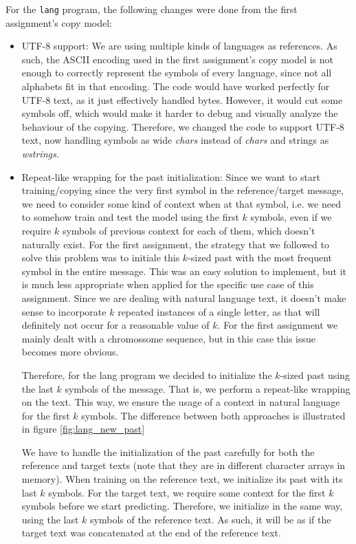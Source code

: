 \documentclass{article}
\begin{document}
For the \texttt{lang} program, the following changes were done from the first assignment's copy model:
\begin{itemize}
    \item UTF-8 support:
    We are using multiple kinds of languages as references.
    As such, the ASCII encoding used in the first assignment's copy model is not enough to correctly represent the symbols of every language, since not all alphabets fit in that encoding.
    The code would have worked perfectly for UTF-8 text, as it just effectively handled bytes.
    However, it would cut some symbols off, which would make it harder to debug and visually analyze the behaviour of the copying.
    Therefore, we changed the code to support UTF-8 text, now handling symbols as wide \textit{chars} instead of \textit{chars} and strings as \textit{wstrings}.
    
    \item Repeat-like wrapping for the past initialization:
    Since we want to start training/copying since the very first symbol in the reference/target message, we need to consider some kind of context when at that symbol, i.e. we need to somehow train and test the model using the first $k$ symbols, even if we require $k$ symbols of previous context for each of them, which doesn't naturally exist.
    For the first assignment, the strategy that we followed to solve this problem was to initiale this $k$-sized past with the most frequent symbol in the entire message.
    This was an easy solution to implement, but it is much less appropriate when applied for the specific use case of this assignment.
    Since we are dealing with natural language text, it doesn't make sense to incorporate $k$ repeated instances of a single letter, as that will definitely not occur for a reasonable value of $k$.
    For the first assignment we mainly dealt with a chromossome sequence, but in this case this issue becomes more obvious.

    Therefore, for the lang program we decided to initialize the $k$-sized past using the last $k$ symbols of the message.
    That is, we perform a repeat-like wrapping on the text.
    This way, we ensure the usage of a context in natural language for the first $k$ symbols.
    The difference between both approaches is illustrated in figure \ref{fig:lang_new_past}

    We have to handle the initialization of the past carefully for both the reference and target texts (note that they are in different character arrays in memory).
    When training on the reference text, we initialize its past with its last $k$ symbols.
    For the target text, we require some context for the first $k$ symbols before we start predicting.
    Therefore, we initialize in the same way, using the last $k$ symbols of the reference text.
    As such, it will be as if the target text was concatenated at the end of the reference text.
    

\end{itemize}
\end{document}
